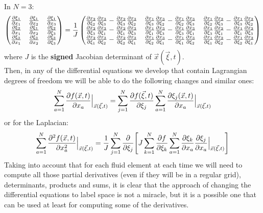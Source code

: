 \documentclass[11pt, a4paper]{article} %
\begin{document}
In $N=3$:
\begin{equation}
\begin{pmatrix}
\pdv{\xi_1}{x_1} & \pdv{\xi_1}{x_2} & \pdv{\xi_1}{x_3} \\
\pdv{\xi_2}{x_1} & \pdv{\xi_1}{x_2} & \pdv{\xi_2}{\xi_3}\\
\pdv{\xi_3}{x_1} & \pdv{\xi_3}{x_2} & \pdv{\xi_3}{\xi_3}
\end{pmatrix}= \frac{1}{J} \begin{pmatrix}
\pdv{x_2}{\xi_2}\pdv{x_3}{\xi_3}-\pdv{x_2}{\xi_3}\pdv{x_3}{\xi_2} & \pdv{x_1}{\xi_3}\pdv{x_3}{\xi_2}- \pdv{x_1}{\xi_2}\pdv{x_3}{\xi_3} & \pdv{x_1}{\xi_2}\pdv{x_2}{\xi_3}-\pdv{x_1}{\xi_3}\pdv{x_2}{\xi_2} \\

\pdv{x_2}{\xi_3}\pdv{x_3}{\xi_1}-\pdv{x_2}{\xi_1}\pdv{x_3}{\xi_3} & \pdv{x_1}{\xi_1}\pdv{x_3}{\xi_3}- \pdv{x_1}{\xi_3}\pdv{x_3}{\xi_1} & \pdv{x_1}{\xi_3}\pdv{x_2}{\xi_1}-\pdv{x_1}{\xi_1}\pdv{x_2}{\xi_3} \\

\pdv{x_2}{\xi_1}\pdv{x_3}{\xi_2}-\pdv{x_2}{\xi_2}\pdv{x_3}{\xi_1} & \pdv{x_1}{\xi_2}\pdv{x_3}{\xi_1}- \pdv{x_1}{\xi_1}\pdv{x_3}{\xi_2} & \pdv{x_1}{\xi_1}\pdv{x_2}{\xi_2}-\pdv{x_1}{\xi_2}\pdv{x_2}{\xi_1} \\

\end{pmatrix}
\end{equation}
where $J$ is the {\bf signed} Jacobian determinant of $\vec{x}(\vec{\xi},t)$.\\

Then, in any of the differential equations we develop that contain Lagrangian degrees of freedom we will be able to do the following changes and similar ones:
\begin{equation}
\sum_{a=1}^N \pdv{f(\vec{x},t)}{x_a}\Big\rvert_{\vec{x}(\vec{\xi},t)} = \sum_{j=1}^N \pdv{f(\vec{\xi},t)}{\xi_j} \sum_{a=1}^N \pdv{\xi_j(\vec{x},t)}{x_a}\Big\rvert_{\vec{x}(\vec{\xi},t)}
\end{equation}
or for the Laplacian:
\begin{equation}
\sum_{a=1}^N \pdv[2]{f(\vec{x},t)}{x_a}\Big\rvert_{\vec{x}(\vec{\xi},t)}=\frac{1}{J} \sum_{j=1}^N\pdv{}{\xi_j} \qty[ J\sum_{k=1}^N\pdv{f}{\xi_k}\sum_{a=1}^N\pdv{\xi_k}{x_a}\pdv{\xi_j}{x_a}\Big\rvert_{\vec{x}(\vec{\xi},t)}]
\end{equation}
Taking into account that for each fluid element at each time we will need to compute all those partial derivatives (even if they will be in a regular grid), determinants, products and sums, it is clear that the approach of changing the differential equations to label space is not a miracle, but it is a possible one that can be used at least for computing some of the derivatives.
\end{document}
